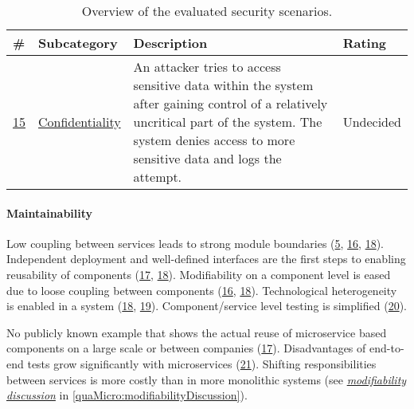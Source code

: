 \begin{table}[H]
  \renewcommand{\arraystretch}{1.2}
  \centering
  \sffamily
  \begin{footnotesize}
    \begin{tabular}{l l p{} p{}}
    \toprule
    \textbf{\#} & \textbf{Subcategory} & \textbf{Description}& \textbf{Rating} \\
    \midrule
    \hyperref[quaMicro:s15]{15} & \hyperref[quaMicro:s15]{Confidentiality} & An attacker tries to access sensitive data within the system after gaining control of a relatively uncritical part of the system. The system denies access to more sensitive data and logs the attempt.
 & Undecided \\
   \bottomrule
    \end{tabular}
  \end{footnotesize}
  \rmfamily
  \caption[Overview of the evaluated security scenarios.]{Overview of the evaluated security scenarios.}
  \label{quaMicro:tableOverview}
\end{table}

\paragraph{Maintainability}
\begin{itemize}
\pro Low coupling between services leads to strong module boundaries (\hyperref[quaMicro:s5]{5}, \hyperref[quaMicro:s16]{16}, \hyperref[quaMicro:s18]{18}).
\pro Independent deployment and well-defined interfaces are the first steps to enabling reusability of components (\hyperref[quaMicro:s17]{17}, \hyperref[quaMicro:s18]{18}).
\pro Modifiability on a component level is eased due to loose coupling between components (\hyperref[quaMicro:s16]{16}, \hyperref[quaMicro:s18]{18}).
\pro Technological heterogeneity is enabled in a system (\hyperref[quaMicro:s18]{18}, \hyperref[quaMicro:s19]{19}).
\pro Component/service level testing is simplified (\hyperref[quaMicro:s20]{20}).

\con No publicly known example that shows the actual reuse of microservice based components on a large scale or between companies (\hyperref[quaMicro:s17]{17}).
\con Disadvantages of end-to-end tests grow significantly with microservices (\hyperref[quaMicro:s21]{21}).
\con Shifting responsibilities between services is more costly than in more monolithic systems (see \textit{\hyperref[quaMicro:modifiabilityDiscussion]{modifiability discussion}} in \ref{quaMicro:modifiabilityDiscussion}).
\end{itemize}

